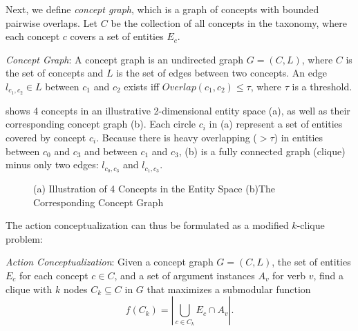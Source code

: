 Next, we define \emph{concept graph}, which is a graph of concepts
with bounded pairwise overlaps.
Let $C$ be the collection of all concepts in the taxonomy,
where each concept $c$ covers a set of entities $E_c$.
\begin{definition}
\emph{Concept Graph}: A concept graph is an
undirected graph $G=(C,L)$, where
$C$ is the set of concepts and $L$ is the set of edges between
two concepts. An edge $l_{c_1,c_2}\in L$ between $c_1$ and $c_2$ exists iff
$Overlap(c_1, c_2)\leq\tau$, where $\tau$ is a threshold.
\end{definition}

 shows 4 concepts in an illustrative 2-dimensional
entity space (a), as well as their corresponding concept graph (b). 
Each circle $c_i$ in (a) represent a set of entities covered by concept $c_i$. 
Because there is heavy overlapping ($>\tau$) in entities between $c_0$ and $c_3$
and between $c_1$ and $c_3$, (b) is a fully connected graph (clique) minus only
two edges: $l_{c_0,c_3}$ and $l_{c_1, c_3}$.

\begin{figure}[th]
\centering
{}
\caption{(a) Illustration of 4 Concepts in the Entity Space
(b)The Corresponding Concept Graph 
}
\label{fig:graph_model}
\end{figure}

The action conceptualization can thus be formulated as a
modified $k$-clique problem:
\begin{definition}
\emph{Action Conceptualization}: Given a concept graph $G=(C,L)$,
the set of entities $E_c$ for each concept $c\in C$,
and a set of argument instances $A_v$ for verb $v$,
find a clique with $k$ nodes $C_k\subseteq C$
in $G$ that maximizes a submodular function
\begin{equation}
f(C_k)=|\bigcup_{c\in C_k}{E_c}\cap A_v|.
\end{equation}
\end{definition}

